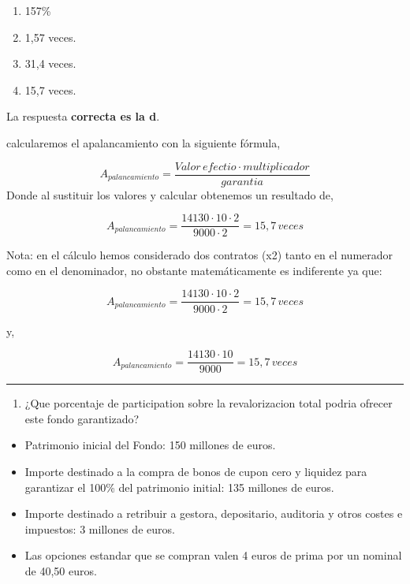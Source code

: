 \documentclass[
  letterpaper,
  DIV=11,
  numbers=noendperiod]{scrreprt}
\providecommand{\tightlist}{%
  \setlength{\itemsep}{0pt}\setlength{\parskip}{0pt}}\usepackage{longtable,booktabs,array}
\begin{document}
\begin{enumerate}
\def\labelenumi{\alph{enumi})}
\item
  157\%
\item
  1,57 veces.
\item
  31,4 veces.
\item
  15,7 veces.
\end{enumerate}

\begin{tcolorbox}[enhanced jigsaw, left=2mm, opacityback=0, colback=white, breakable, arc=.35mm, bottomrule=.15mm, rightrule=.15mm, toprule=.15mm, leftrule=.75mm, colframe=quarto-callout-tip-color-frame]
\begin{minipage}[t]{5.5mm}
\textcolor{quarto-callout-tip-color}{\faLightbulb}
\end{minipage}%
\begin{minipage}[t]{\textwidth - 5.5mm}

La respuesta \textbf{correcta es la d}.

calcularemos el apalancamiento con la siguiente fórmula,

\[A_{palancamiento}=\frac{Valor\,efectio\cdot multiplicador}{garantia}\]
Donde al sustituir los valores y calcular obtenemos un resultado de,

\[A_{palancamiento}=\frac{14130\cdot10\cdot 2}{9000\cdot2}=15,7\,veces\]

Nota: en el cálculo hemos considerado dos contratos (x2) tanto en el
numerador como en el denominador, no obstante matemáticamente es
indiferente ya que:

\[A_{palancamiento}=\frac{14130\cdot10\cdot 2}{9000\cdot2}=15,7\,veces\]

y,

\[A_{palancamiento}=\frac{14130\cdot10}{9000}=15,7\,veces\]

\end{minipage}%
\end{tcolorbox}

\begin{center}\rule{0.5\linewidth}{0.5pt}\end{center}

\begin{enumerate}
\def\labelenumi{\arabic{enumi}.}
\setcounter{enumi}{63}
\tightlist
\item
  ¿Que porcentaje de participation sobre la revalorizacion total podria
  ofrecer este fondo garantizado?
\end{enumerate}

\begin{itemize}
\item
  Patrimonio inicial del Fondo: 150 millones de euros.
\item
  Importe destinado a la compra de bonos de cupon cero y liquidez para
  garantizar el 100\% del patrimonio initial: 135 millones de euros.
\item
  Importe destinado a retribuir a gestora, depositario, auditoria y
  otros costes e impuestos: 3 millones de euros.
\item
  Las opciones estandar que se compran valen 4 euros de prima por un
  nominal de 40,50 euros.
\end{itemize}
\end{document}
